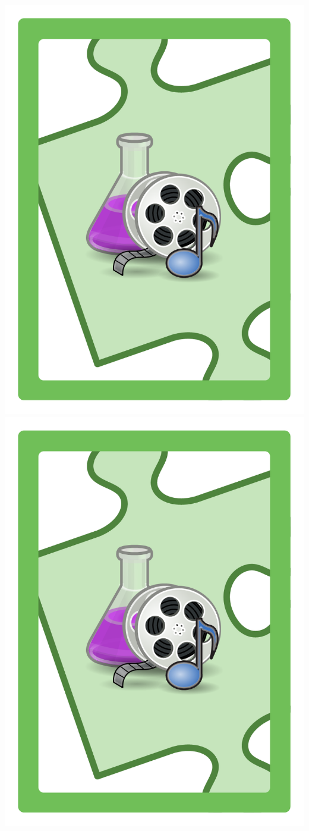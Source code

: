 \documentclass{letter}
\begin{document}
\includegraphics{lo0t/lo0t.shares_ip}
\includegraphics{lo0t/lo0t.shares_ip}
\end{document}
